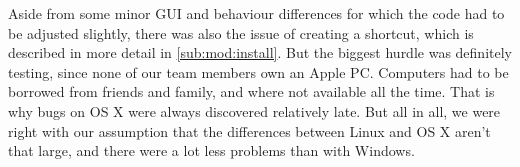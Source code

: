 Aside from some minor GUI and behaviour differences for which the code had to be adjusted slightly, there was also the issue of creating a shortcut, which is described in more detail in \cref{sub:mod:install}. But the biggest hurdle was definitely testing, since none of our team members own an Apple PC. Computers had to be borrowed from friends and family, and where not available all the time. That is why bugs on OS X were always discovered relatively late. But all in all, we were right with our assumption that the differences between Linux and OS X aren't that large, and there were a lot less problems than with Windows.
